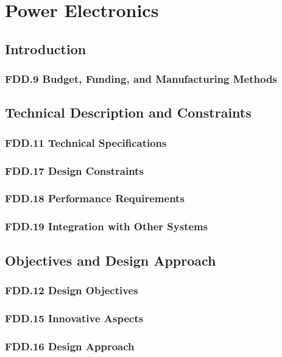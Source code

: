 \section{Power Electronics}

\subsection{Introduction}
\subsubsection{FDD.9 Budget, Funding, and Manufacturing Methods}
 
\subsection{Technical Description and Constraints}
\subsubsection{FDD.11 Technical Specifications}
 
\subsubsection{FDD.17 Design Constraints}
 
\subsubsection{FDD.18 Performance Requirements}
 
\subsubsection{FDD.19 Integration with Other Systems}
 
\subsection{Objectives and Design Approach}
\subsubsection{FDD.12 Design Objectives}
 
\subsubsection{FDD.15 Innovative Aspects}
 
\subsubsection{FDD.16 Design Approach}
 
